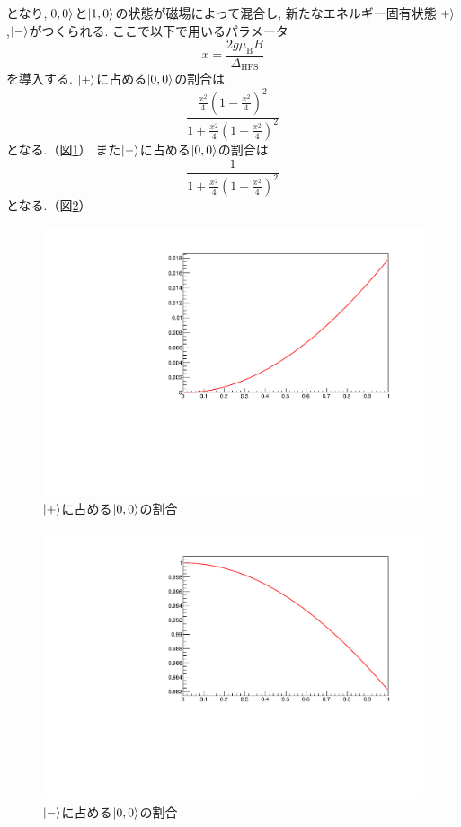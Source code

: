 となり,$\ket{0,0}$と$\ket{1,0}$の状態が磁場によって混合し,
新たなエネルギー固有状態$\ket{+}$,$\ket{-}$がつくられる.
ここで以下で用いるパラメータ
\begin{equation}
	\nonumber
	x = \frac{2g\mu_{\mathrm{B}}B}{\Delta_{\mathrm{HFS}}}
\end{equation}
を導入する.
$\ket{+}$に占める$\ket{0,0}$の割合は
\begin{equation}
	\nonumber
\frac{ \frac{x^{2}}{4} \left(1-\frac{x^{2}}{4}\right)^{2}  }{  1+\frac{x^{2}}{4}\left( 1-\frac{x^{2}}{4} \right)^2   }
\end{equation}
となる.（図\ref{fig:plusstate}）
また$\ket{-}$に占める$\ket{0,0}$の割合は
\begin{equation}
	\nonumber
\frac{1}{1+\frac{x^{2}}{4}\left(1-\frac{x^{2}}{4}\right)^{2}}
\end{equation}
となる.（図\ref{fig:minusstate}）

\begin{figure}[H]
\centering
\includegraphics[keepaspectratio,angle=270,scale=0.6]{fig/ybm/plusstate.pdf}
\caption{$\ket{+}$に占める$\ket{0,0}$の割合}
\label{fig:plusstate}
\end{figure}

\begin{figure}[H]
\centering
\includegraphics[keepaspectratio,angle=270,scale=0.6]{fig/ybm/minusstate.pdf}
\caption{$\ket{-}$に占める$\ket{0,0}$の割合}
\label{fig:minusstate}
\end{figure}

